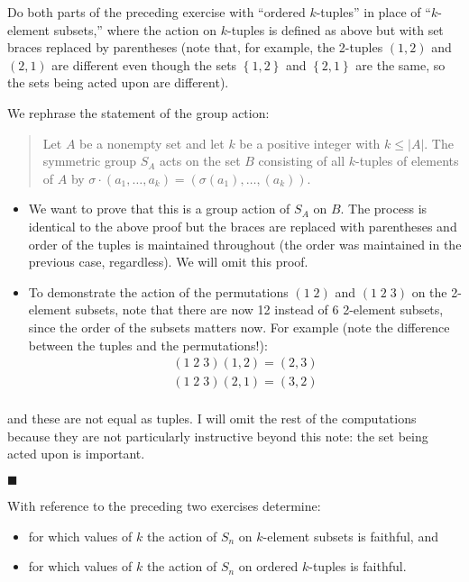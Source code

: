 \documentclass[12pt]{article}
\renewcommand{\qed}{\hfill$\blacksquare$}
\renewenvironment{proof}{\begin{addmargin}[1em]{0em}\begin{newproof}}{\end{newproof}\end{addmargin}\qed}
\newenvironment{problem}[2][Exercise]{\begin{trivlist}
\item[\hskip \labelsep {\bfseries #1}\hskip \labelsep {\bfseries #2.}]}{\end{trivlist}}
\begin{document}
\begin{problem}{1.7.9}
Do both parts of the preceding exercise with ``ordered $k$-tuples'' in place of ``$k$-element subsets,'' where the action on $k$-tuples is defined as above but with set braces replaced by parentheses (note that, for example, the 2-tuples $\left(1,2\right)$ and $\left(2,1\right)$ are different even though the sets $\left\{1,2\right\}$ and $\left\{2,1\right\}$ are the same, so the sets being acted upon are different).
\end{problem}
\begin{proof}
We rephrase the statement of the group action:
\begin{quote}
    Let $A$ be a nonempty set and let $k$ be a positive integer with $k\leq \left|A\right|$. The symmetric group $S_A$ acts on the set $B$ consisting of all $k$-tuples of elements of $A$ by $\sigma\cdot \left(a_1,\ldots,a_k\right) = \left(\sigma\left(a_1\right),\ldots,\left(a_k\right)\right)$.
\end{quote}
\begin{itemize}
    \item We want to prove that this is a group action of $S_A$ on $B$. The process is identical to the above proof but the braces are replaced with parentheses and order of the tuples is maintained throughout (the order was maintained in the previous case, regardless). We will omit this proof.
    \item To demonstrate the action of the permutations $\left(1\;2\right)$ and $\left(1\;2\;3\right)$ on the 2-element subsets, note that there are now 12 instead of 6 2-element subsets, since the order of the subsets matters now. For example (note the difference between the tuples and the permutations!):
    \begin{equation*}
        \begin{split}
            \left(1\;2\;3\right) \left( 1,2\right) = \left(2,3 \right) \\
            \left(1\;2\;3\right) \left( 2,1 \right) = \left(3,2 \right) \\
        \end{split}
    \end{equation*}
\end{itemize}
and these are not equal as tuples. I will omit the rest of the computations because they are not particularly instructive beyond this note: the set being acted upon is important.
\end{proof}


\begin{problem}{1.7.10}
With reference to the preceding two exercises determine:
\begin{itemize}
    \item for which values of $k$ the action of $S_n$ on $k$-element subsets is faithful, and
    \item for which values of $k$ the action of $S_n$ on ordered $k$-tuples is faithful.
\end{itemize}
\end{problem}
\end{document}
